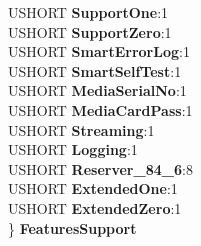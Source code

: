 \begin{DoxyCompactItemize}
\begin{tabbing}
\>USHORT {\bfseries SupportOne}:1\\
\>USHORT {\bfseries SupportZero}:1\\
\>USHORT {\bfseries SmartErrorLog}:1\\
\>USHORT {\bfseries SmartSelfTest}:1\\
\>USHORT {\bfseries MediaSerialNo}:1\\
\>USHORT {\bfseries MediaCardPass}:1\\
\>USHORT {\bfseries Streaming}:1\\
\>USHORT {\bfseries Logging}:1\\
\>USHORT {\bfseries Reserver\_84\_6}:8\\
\>USHORT {\bfseries ExtendedOne}:1\\
\>USHORT {\bfseries ExtendedZero}:1\\
\} {\bfseries FeaturesSupport}\\


\end{tabbing}
\end{DoxyCompactItemize}
